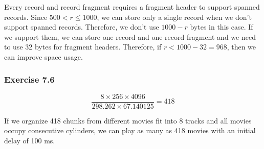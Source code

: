 \documentclass[../../main.tex]{subfiles}
\begin{document}
Every record and record fragment requires a fragment header to support spanned records. Since
$500 < r \leq 1000$, we can store only a single record when we don't support spanned records.
Therefore, we don't use $1000-r$ bytes in this case. If we support them, we can store one record
and one record fragment and we need to use 32 bytes for fragment headers. Therefore,
if $r < 1000 - 32 = 968$, then we can improve space usage.

\subsubsection*{Exercise 7.6}

$$
\frac{8 \times 256 \times 4096}{298.262 \times 67.140125} = 418
$$

If we organize 418 chunks from different movies fit into 8 tracks
and all movies occupy consecutive cylinders, we can play as many as
418 movies with an initial delay of 100 ms.
\end{document}
